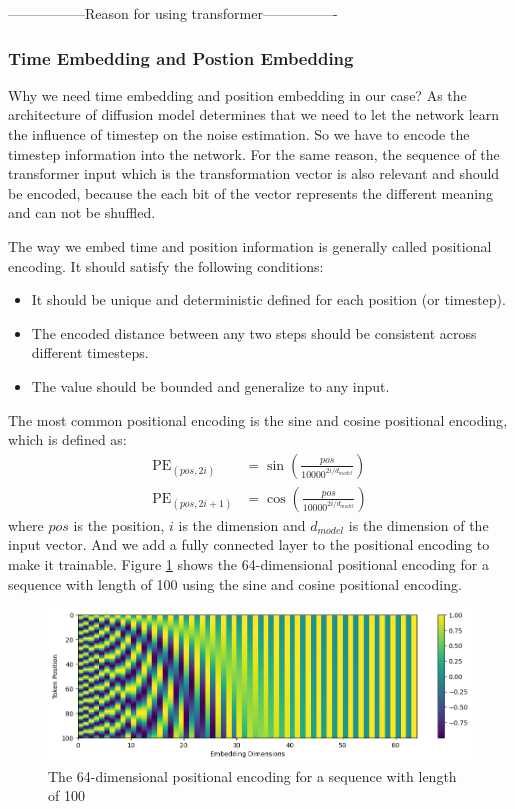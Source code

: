 \documentclass[12pt,DIV14,BCOR12mm,a4paper,footinclude=false,headinclude,parskip=half-,twoside,openright,cleardoublepage=empty,toc=index,bibliography=totoc,listof=totoc]{scrreprt}
\numberwithin{equation}{chapter}
\begin{document}
-----------------Reason for using transformer----------------

\subsubsection{Time Embedding and Postion Embedding}
Why we need time embedding and position embedding in our case? As the architecture of diffusion model determines that we need to let the network learn the influence of timestep on the noise estimation. So we have to encode the timestep information into the network. For the same reason, the sequence of the transformer input which is the transformation vector is also relevant and should be encoded, because the each bit of the vector represents the different meaning and can not be shuffled.

The way we embed time and position information is generally called positional encoding. It should satisfy the following conditions\cite{kazemnejad2019:pencoding}:
\begin{itemize}
  \item It should be unique and deterministic defined for each position (or timestep).
  \item The encoded distance between any two steps should be consistent across different timesteps.
  \item The value should be bounded and generalize to any input.
\end{itemize}
The most common positional encoding is the sine and cosine positional encoding\cite{vaswani2023attention}, which is defined as:
\begin{align}
  \text{PE}_{(pos, 2i)} &= \sin\left(\frac{pos}{10000^{2i/d_{model}}}\right)\\
  \text{PE}_{(pos, 2i+1)} &= \cos\left(\frac{pos}{10000^{2i/d_{model}}}\right)
\end{align}
where $pos$ is the position, $i$ is the dimension and $d_{model}$ is the dimension of the input vector. And we add a fully connected layer to the positional encoding to make it trainable. Figure \ref{img:pe} shows the 64-dimensional positional encoding for a sequence with length of 100 using the sine and cosine positional encoding.
\begin{figure}[h]
	\centering
	\includegraphics[scale=.65]{img/pe.png}
	\caption{The 64-dimensional positional encoding for a sequence with length of 100}
	\label{img:pe}
\end{figure}
\end{document}
